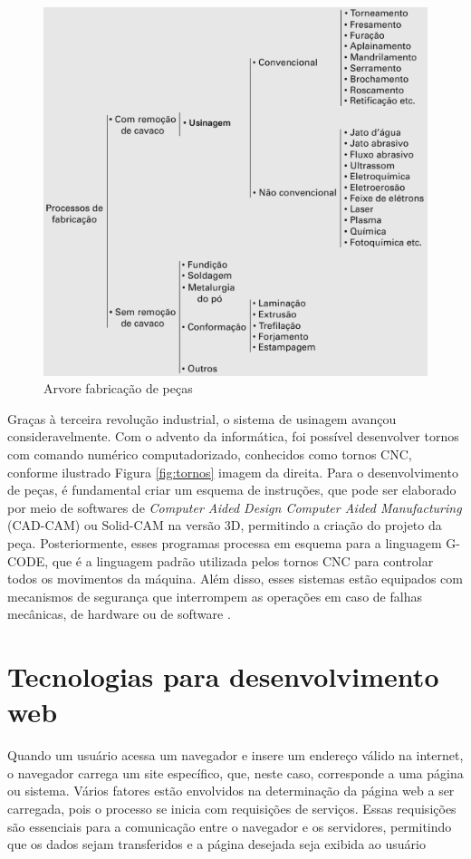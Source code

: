 \begin{figure}[h!]
    \centering
    \includegraphics[width=0.75\linewidth]{figs/usinagem_tipos.png}
    \caption{Arvore fabricação de peças \cite{b:usinagem_2015} }
    \label{fig:tipo_usinagem}
\end{figure}

Graças à terceira revolução industrial, o sistema de usinagem avançou consideravelmente. Com o advento da informática, foi possível desenvolver tornos com comando numérico computadorizado, conhecidos como tornos CNC, conforme ilustrado Figura \ref{fig:tornos} imagem da direita. Para o desenvolvimento de peças, é fundamental criar um esquema de instruções, que pode ser elaborado por meio de softwares de \textit{Computer Aided Design  Computer Aided Manufacturing} (CAD-CAM) ou Solid-CAM na versão 3D, permitindo a criação do projeto da peça. Posteriormente, esses programas processa em esquema para a linguagem G-CODE, que é a linguagem padrão utilizada pelos tornos CNC para controlar todos os movimentos da máquina. Além disso, esses sistemas estão equipados com mecanismos de segurança que interrompem as operações em caso de falhas mecânicas, de hardware ou de software \mbox{\cite{a:torno_cnc_2022}.}

\section{Tecnologias para desenvolvimento web}
\label{sec:tecnologia_web}

Quando um usuário acessa um navegador e insere um endereço válido na internet, o navegador carrega um site específico, que, neste caso, corresponde a uma página ou sistema. Vários fatores estão envolvidos na determinação da página web a ser carregada, pois o processo se inicia com requisições de serviços. Essas requisições são essenciais para a comunicação entre o navegador e os servidores, permitindo que os dados sejam transferidos e a página desejada seja exibida ao usuário

